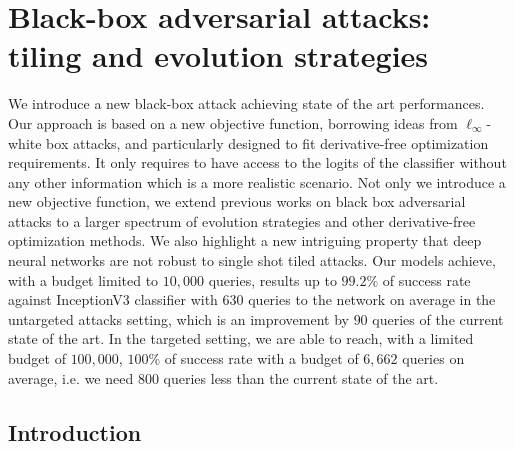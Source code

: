 \chapter{Black-box adversarial attacks: tiling and evolution strategies}
\label{paper:dfo-attacks}

\newcommand{\fix}{\marginpar{FIX}}
\newcommand{\new}{\marginpar{NEW}}

\newcommand{\nico}[1]{{\color{blue} #1}}

\def\fixme#1{\textcolor{red}{[#1]}\marginpar{\hspace*{-5pt}\textcolor{red}{FIXME}}}


We introduce a new black-box attack achieving state of the art performances. Our approach is based on a new objective function, borrowing ideas from $\ell_\infty$-white box attacks, and particularly designed to fit derivative-free optimization requirements. It only requires to have access to the logits of the classifier without any other information which is a more realistic scenario.  Not only we introduce a new objective function, we extend previous works on black box adversarial attacks to a larger spectrum of evolution strategies and other derivative-free optimization methods. We also highlight a new intriguing property that deep neural networks are not robust to single shot tiled attacks. Our models achieve, with a budget limited to $10,000$ queries, results up to $99.2\%$ of success rate against InceptionV3 classifier  with $630$  queries to the network on average in the untargeted attacks setting, which is an improvement by $90$ queries of  the current state of the art. In the targeted setting, we are able to reach, with a limited budget of $100,000$, $100\%$ of success rate with a budget of $6,662$ queries on average, i.e. we need $800$ queries less than the current state of the art.




\section{Introduction}

